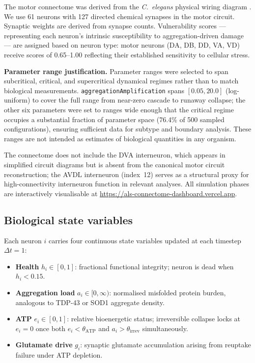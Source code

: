 \documentclass[12pt,a4paper]{article}
\begin{document}
The motor connectome was derived from the \textit{C.~elegans} physical wiring diagram
\citep{white1986,cook2019}. We use 61 neurons with 127 directed chemical synapses in the motor
circuit. Synaptic weights are derived from synapse counts. Vulnerability scores ---
representing each neuron's intrinsic susceptibility to aggregation-driven damage --- are
assigned based on neuron type: motor neurons (DA, DB, DD, VA, VD) receive scores of 0.65--1.00
reflecting their established sensitivity to cellular stress.

\textbf{Parameter range justification.} Parameter ranges were selected to span subcritical,
critical, and supercritical dynamical regimes rather than to match biological measurements.
\texttt{aggregationAmplification} spans $[0.05, 20.0]$ (log-uniform) to cover the full range
from near-zero cascade to runaway collapse; the other six parameters were set to ranges wide
enough that the critical regime occupies a substantial fraction of parameter space (76.4\% of
500 sampled configurations), ensuring sufficient data for subtype and boundary analysis. These
ranges are not intended as estimates of biological quantities in any organism.

The connectome does not include the
DVA interneuron, which appears in simplified circuit diagrams but is absent from the canonical
motor circuit reconstruction; the AVDL interneuron (index~12) serves as a structural proxy for
high-connectivity interneuron function in relevant analyses. All simulation phases are
interactively visualisable at \url{https://als-connectome-dashboard.vercel.app}.

\subsection{Biological state variables}

Each neuron $i$ carries four continuous state variables updated at each timestep $\Delta t = 1$:

\begin{itemize}
\item \textbf{Health} $h_i \in [0, 1]$: fractional functional integrity; neuron is dead when
$h_i < 0.15$.
\item \textbf{Aggregation load} $a_i \in [0, \infty)$: normalised misfolded protein burden,
analogous to TDP-43 or SOD1 aggregate density.
\item \textbf{ATP} $e_i \in [0, 1]$: relative bioenergetic status; irreversible collapse locks
at $e_i = 0$ once both $e_i < \theta_{\text{ATP}}$ and $a_i > \theta_{\text{irrev}}$
simultaneously.
\item \textbf{Glutamate drive} $g_i$: synaptic glutamate accumulation arising from reuptake
failure under ATP depletion.
\end{itemize}
\end{document}
